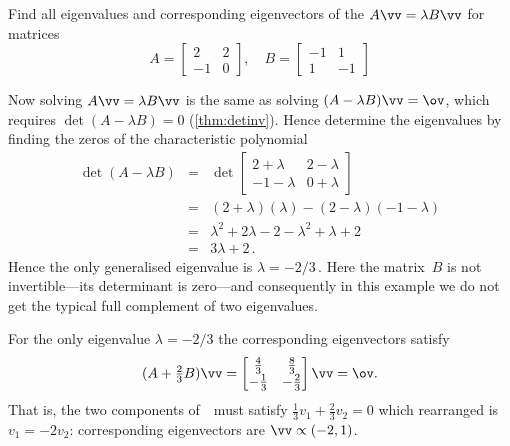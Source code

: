 \begin{example} \label{eg:}
Find all eigenvalues and corresponding eigenvectors of the  \(A\vv=\lambda B\vv\) for matrices
\begin{equation*}
A=\begin{bmatrix} 2&2\\-1&0 \end{bmatrix},\quad
B=\begin{bmatrix} -1&1\\1&-1 \end{bmatrix}
\end{equation*}
\begin{solution} 
Now solving \(A\vv=\lambda B\vv\) is the same as solving \((A-\lambda B)\vv=\ov\), which requires \(\det(A-\lambda B)=0\) (\autoref{thm:detinv}).
Hence determine the eigenvalues by finding the zeros of the characteristic polynomial
\begin{eqnarray*}
\det(A-\lambda B)
&=&\det\begin{bmatrix} 2+\lambda&2-\lambda\\-1-\lambda&0+\lambda \end{bmatrix}
\\&=&(2+\lambda)(\lambda)-(2-\lambda)(-1-\lambda)
\\&=&\lambda^2+2\lambda-2-\lambda^2+\lambda+2
\\&=&3\lambda+2\,.
\end{eqnarray*}
Hence the only generalised eigenvalue is \(\lambda=-2/3\)\,.
Here the matrix~\(B\) is not invertible---its determinant is zero---and consequently in this example we do not get the typical full complement of two eigenvalues.

For the only eigenvalue \(\lambda=-2/3\) the corresponding eigenvectors satisfy
\begin{equation*}
(A+\tfrac23B)\vv=\begin{bmatrix} \tfrac43&\tfrac83\\-\tfrac13&-\tfrac23 \end{bmatrix}\vv=\ov.
\end{equation*}
That is, the two components of~\vv\ must satisfy \(\tfrac13v_1+\tfrac23v_2=0\) which rearranged is \(v_1=-2v_2\): corresponding eigenvectors are \(\vv\propto(-2,1)\).
\end{solution}
\end{example}





